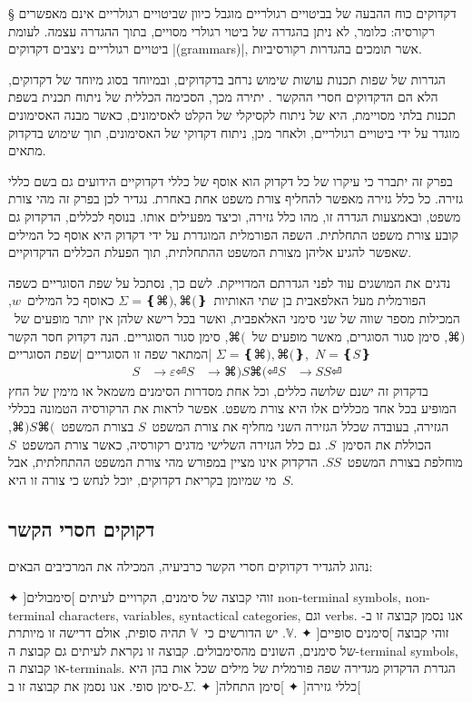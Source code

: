 § דקדוקים
כוח ההבעה של בביטויים רגולריים מוגבל כיוון שביטויים רגולריים אינם מאפשרים
רקורסיה: כלומר, לא ניתן בהגדרה של ביטוי רגולרי מסויים, בתוך ההגדרה עצמה. לעומת
ביטויים רגולריים ניצבים דקדוקים \E|(grammars)|, אשר תומכים בהגדרות רקורסיביות.

הגדרות של שפות תכנות עושות שימוש נרחב בדקדוקים, ובמיוחד בסוג מיוחד של דקדוקים,
הלא הם הדקדוקים חסרי ההקשר . יתירה מכך, הסכימה
הכללית של ניתוח תכנית בשפת תכנות בלתי מסויימת, היא של ניתוח לקסיקלי של הקלט
לאסימונים, כאשר מבנה האסימונים מוגדר על ידי ביטויים רגולריים, ולאחר מכן, ניתוח
דקדוקי של האסימונים, תוך שימוש בדקדוק מתאים.

בפרק זה יתברר כי עיקרו של כל דקדוק הוא אוסף של כללי דקדוקיים הידועים גם בשם
כללי גזירה. כל כלל גזירה מאפשר להחליף צורת משפט אחת באחרת. נגדיר לכן בפרק זה
מהי צורת משפט, ובאמצעות הגדרה זו, מהו כלל גזירה, וכיצד מפעילים אותו. בנוסף
לכללים, הדקדוק גם קובע צורת משפט התחלתית. השפה הפורמלית המוגדרת על ידי דקדוק
היא אוסף כל המילים שאפשר להגיע אליהן מצורת המשפט ההתחלתית, תוך הפעלת הכללים
הדקדוקיים.

נדגים את המושגים עוד לפני הגדרתם המדוייקת. לשם כך, נסתכל על שפת הסוגריים כשפה
הפורמלית מעל האלפאבית בן שתי האותיות~$Σ=❴⌘), ⌘(❵$ כאוסף כל המילים~$w$,
המכילות מספר שווה
של שני סימני האלאפבית, ואשר בכל רישא שלהן אין יותר מופעים של~$⌘)$, סימן סגור
הסוגרים, מאשר מופעים של~$⌘($, סימן סגור הסוגריים.
הנה דקדוק חסר הקשר המתאר שפה זו
הסוגריים |שפת הסוגריים|
$Σ=❴⌘), ⌘(❵$,~$N=❴S❵$
\begin{equation}
  \label{eq:parenthesis}
  \begin{split}
    S &→ε ⏎
    S &→⌘)S⌘(⏎
    S &→SS ⏎
  \end{split}
\end{equation}
בדקדוק זה ישנם שלושה כללים, וכל אחת מסדרות הסימנים משמאל או מימין של החץ המופיע
בכל אחד מכללים אלו היא צורת משפט. אפשר לראות את הרקורסיה הטמונה בכללי
הגזירה, בעובדה שכלל הגזירה השני מחליף את צורת המשפט~$S$ בצורת המשפט~$⌘)S⌘($,
הכוללת את הסימן~$S$. גם כלל הגזירה השלישי מדגים רקורסיה, כאשר צורת המשפט~$S$
מוחלפת בצורת המשפט~$SS$. הדקדוק אינו מציין במפורש מהי צורת המשפט ההתחלתית,
אבל מי שמיומן בקריאת דקדוקים, יוכל לנחש כי צורה זו היא~$S$.

\subsection{דקוקים חסרי הקשר}
נהוג להגדיר דקדוקים חסרי הקשר כרביעיה,
המכילה את המרכיבים הבאים:
\begin{description}
✦ ]סימבולים[ זוהי קבוצה של סימנים, הקרויים לעיתים non-terminal symbols,
non-terminal characters, variables, syntactical categories, וגם verbs.
אנו נסמן קבוצה זו ב-$𝕍$. יש הדורשים כי~$𝕍$ תהיה סופית,
אולם דרישה זו מיותרת.
✦ ]סימנים סופיים[ זוהי קבוצה של סימנים, השונים מהסימבולים. קבוצה זו נקראת
לעיתים גם קבוצת ה-terminal symbols, או קבוצת ה-terminals. הגדרת הדקדוק מגדירה
  שפה פורמלית של מילים שכל אות בהן היא סימן סופי. אנו נסמן את
קבוצה זו ב-$Σ$.
✦ ]כללי גזירה[
✦ ]סימן התחלה[
\end{description}

